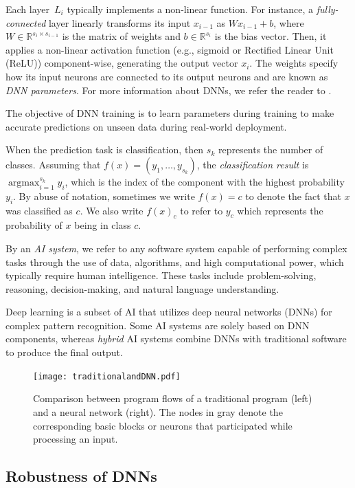 Each layer~$L_i$ typically implements a non-linear function. For instance, a \emph{fully-connected} layer linearly transforms its input $x_{i-1}$ as $W x_{i-1} + b$, where $W\in\mathbb{R}^{s_{i} \times s_{i-1}}$ is the matrix of weights and $b\in\mathbb{R}^{s_i}$ is the bias vector. Then, it applies a non-linear activation function (e.g., sigmoid or Rectified Linear Unit (ReLU)) component-wise, generating the output vector $x_i$. The weights specify how its input neurons are connected to its output neurons and are known as \emph{DNN parameters}. For more information about DNNs, we refer the reader to \cite{dnn_archi, Hassija, Liang}.

The objective of DNN training is to learn parameters during training to make accurate predictions on unseen data during real-world deployment.

When the prediction task is classification, then $s_k$ represents the number of classes. Assuming that $f(x) = (y_1,\dots,y_{s_k})$, the \emph{classification result} is $\displaystyle\mathop{\text{argmax}}_{i=1}^{s_k} y_i$, which is the index of the component with the highest probability $y_i$. By abuse of notation, sometimes we write $f(x)=c$ to denote the fact that $x$ was classified as $c$. We also write $f(x)_c$ to refer to $y_c$ which represents the probability of $x$ being in class $c$.

By an \emph{AI system}, we refer to any software system capable of performing complex tasks through the use of data, algorithms, and high computational power, which typically require human intelligence. These tasks include problem-solving, reasoning, decision-making, and natural language understanding.

Deep learning is a subset of AI that utilizes deep neural networks (DNNs) for complex pattern recognition. Some AI systems are solely based on DNN components, whereas \emph{hybrid} AI systems combine DNNs with traditional software to produce the final output.

\begin{figure}
    \centering
    \texttt{[image: traditionalandDNN.pdf]}
    \caption{Comparison between program flows of a traditional program (left) and a neural network (right). The nodes in gray denote the corresponding basic blocks or neurons that participated while processing an input.}
    \label{fig:graph}
\end{figure}

\subsection{Robustness of DNNs}

